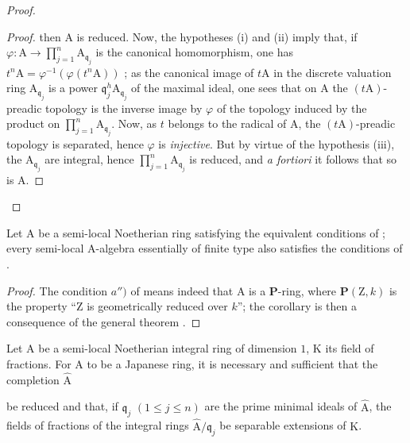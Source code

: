 \begin{proof}
\begin{proof}
then $\mathrm{A}$ is reduced. Now, the hypotheses (i) and (ii) imply that, if $\varphi:\mathrm{A}\to\prod_{j=1}^n\mathrm{A}_{\mathfrak{q}_j}$ is the canonical homomorphism, one has $t^n\mathrm{A}=\varphi^{-1}(\varphi(t^n\mathrm{A}))$ ; as the canonical image of $t\mathrm{A}$ in the discrete valuation ring $\mathrm{A}_{\mathfrak{q}_j}$ is a power $\mathfrak{q}_j^h\mathrm{A}_{\mathfrak{q}_j}$ of the maximal ideal, one sees that on $\mathrm{A}$ the $(t\mathrm{A})$-preadic topology is the inverse image by $\varphi$ of the topology induced by the product on $\prod_{j=1}^n\mathrm{A}_{\mathfrak{q}_j}$. Now, as $t$ belongs to the radical of $\mathrm{A}$, the $(t\mathrm{A})$-preadic topology is separated, hence $\varphi$ is \emph{injective}. But by virtue of the hypothesis (iii), the $\mathrm{A}_{\mathfrak{q}_j}$ are integral, hence $\prod_{j=1}^n\mathrm{A}_{\mathfrak{q}_j}$ is reduced, and \emph{a fortiori} it follows that so is $\mathrm{A}$.
\end{proof}
\end{proof}

\begin{corollary}[7.6.5]
\label{IV.7.6.5}
Let $\mathrm{A}$ be a semi-local Noetherian ring satisfying the equivalent conditions of ; every semi-local $\mathrm{A}$-algebra essentially of finite type also satisfies the conditions of .
\end{corollary}

\begin{proof}
The condition $a'')$ of  means indeed that $\mathrm{A}$ is a $\boldsymbol{P}$-ring, where $\boldsymbol{P}(\mathrm{Z},k)$ is the property ``$\mathrm{Z}$ is geometrically reduced over $k$''; the corollary is then a consequence of the general theorem .
\end{proof}

\begin{corollary}[7.6.6]
\label{IV.7.6.6}
Let $\mathrm{A}$ be a semi-local Noetherian integral ring of dimension $1$, $\mathrm{K}$ its field of fractions. For $\mathrm{A}$ to be a Japanese ring, it is necessary and sufficient that the completion $\widehat{\mathrm{A}}$


be reduced and that, if $\mathfrak{q}_j$ $(1\leqslant j\leqslant n)$ are the prime minimal ideals of $\widehat{\mathrm{A}}$, the fields of fractions of the integral rings $\widehat{\mathrm{A}}/\mathfrak{q}_j$ be separable extensions of $\mathrm{K}$.
\end{corollary}

